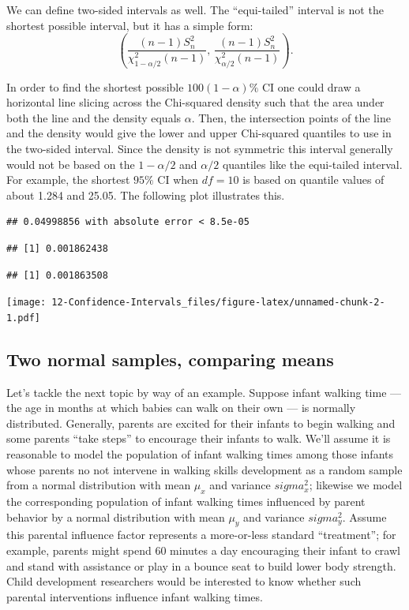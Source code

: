 \documentclass[
]{book}
\begin{document}
We can define two-sided intervals as well. The ``equi-tailed'' interval is not the shortest possible interval, but it has a simple form:
\[\left(\frac{(n-1)S_n^2}{\chi^2_{1-\alpha/2}(n-1)}, \, \frac{(n-1)S_n^2}{\chi^2_{\alpha/2}(n-1)}\right).\]

In order to find the shortest possible \(100(1-\alpha)\%\) CI one could draw a horizontal line slicing across the Chi-squared density such that the area under both the line and the density equals \(\alpha\). Then, the intersection points of the line and the density would give the lower and upper Chi-squared quantiles to use in the two-sided interval. Since the density is not symmetric this interval generally would not be based on the \(1-\alpha/2\) and \(\alpha/2\) quantiles like the equi-tailed interval. For example, the shortest \(95\%\) CI when \(df=10\) is based on quantile values of about 1.284 and 25.05. The following plot illustrates this.

\begin{verbatim}
## 0.04998856 with absolute error < 8.5e-05
\end{verbatim}

\begin{verbatim}
## [1] 0.001862438
\end{verbatim}

\begin{verbatim}
## [1] 0.001863508
\end{verbatim}

\texttt{[image: 12-Confidence-Intervals\_files/figure-latex/unnamed-chunk-2-1.pdf]}

\hypertarget{two-normal-samples-comparing-means}{%
\subsection{Two normal samples, comparing means}\label{two-normal-samples-comparing-means}}

Let's tackle the next topic by way of an example. Suppose infant walking time --- the age in months at which babies can walk on their own --- is normally distributed. Generally, parents are excited for their infants to begin walking and some parents ``take steps'' to encourage their infants to walk. We'll assume it is reasonable to model the population of infant walking times among those infants whose parents no not intervene in walking skills development as a random sample from a normal distribution with mean \(\mu_x\) and variance \(sigma_x^2\); likewise we model the corresponding population of infant walking times influenced by parent behavior by a normal distribution with mean \(\mu_y\) and variance \(sigma_y^2\). Assume this parental influence factor represents a more-or-less standard ``treatment''; for example, parents might spend 60 minutes a day encouraging their infant to crawl and stand with assistance or play in a bounce seat to build lower body strength. Child development researchers would be interested to know whether such parental interventions influence infant walking times.
\end{document}

